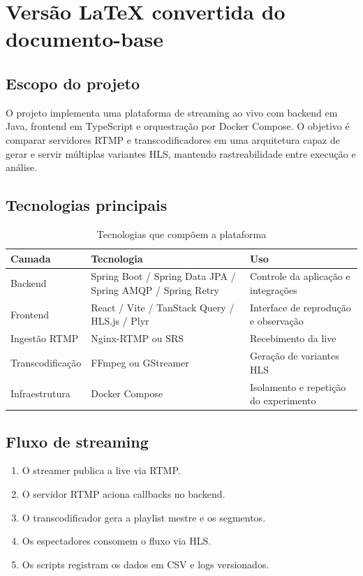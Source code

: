 \section{Versão LaTeX convertida do documento-base}

\subsection{Escopo do projeto}

O projeto implementa uma plataforma de streaming ao vivo com backend em Java, frontend em TypeScript e orquestração por Docker Compose. O objetivo é comparar servidores RTMP e transcodificadores em uma arquitetura capaz de gerar e servir múltiplas variantes HLS, mantendo rastreabilidade entre execução e análise.

\subsection{Tecnologias principais}

\begin{table}[H]
\centering
\caption{Tecnologias que compõem a plataforma}
\begin{tabularx}{\textwidth}{@{}lXX@{}}
\toprule
\textbf{Camada} & \textbf{Tecnologia} & \textbf{Uso} \\
\midrule
Backend & Spring Boot / Spring Data JPA / Spring AMQP / Spring Retry & Controle da aplicação e integrações \\
Frontend & React / Vite / TanStack Query / HLS.js / Plyr & Interface de reprodução e observação \\
Ingestão RTMP & Nginx-RTMP ou SRS & Recebimento da live \\
Transcodificação & FFmpeg ou GStreamer & Geração de variantes HLS \\
Infraestrutura & Docker Compose & Isolamento e repetição do experimento \\
\bottomrule
\end{tabularx}
\end{table}

\subsection{Fluxo de streaming}

\begin{enumerate}[leftmargin=1.2cm]
  \item O streamer publica a live via RTMP.
  \item O servidor RTMP aciona callbacks no backend.
  \item O transcodificador gera a playlist mestre e os segmentos.
  \item Os espectadores consomem o fluxo via HLS.
  \item Os scripts registram os dados em CSV e logs versionados.
\end{enumerate}


